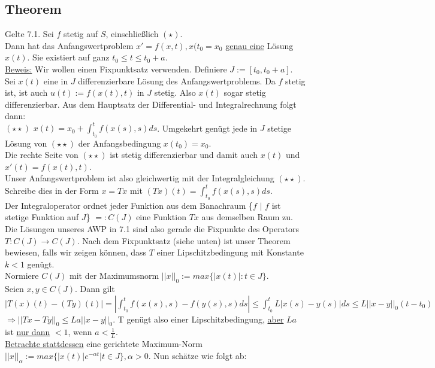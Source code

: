 \documentclass[12pt,a4paper]{article}
\newcommand{\Lsg}{Lösung }
\newcommand{\LSG}{Lösungen }
\begin{document}
\subsection{Theorem}
Gelte 7.1. Sei $f$ stetig auf $S$, einschließlich $(\star)$. \\
Dann hat das Anfangswertproblem $x'=f(x,t), x(t_0 = x_0$ \underline{genau eine} \Lsg $x(t)$. Sie existiert auf ganz $t_0 \leq t \leq t_0 + a$. \\
\underline{Beweis:} Wir wollen einen Fixpunktsatz verwenden. Definiere $J := [t_0, t_0+a]$. \\
Sei $x(t)$ eine in $J$ differenzierbare \Lsg des Anfangswertproblems. Da $f$ stetig ist, ist auch $u(t):=f(x(t),t)$ in $J$ stetig. Also $x(t)$ sogar stetig differenzierbar. Aus dem Hauptsatz der Differential- und Integralrechnung folgt dann: \\
$(\star \star)$ $x(t) = x_0 + \int_{t_0}^{t} f(x(s),s) ds$. Umgekehrt genügt jede in $J$ stetige \Lsg von $(\star \star)$ der Anfangsbedingung $x(t_0) = x_0$. \\
Die rechte Seite von $(\star \star)$ ist stetig differenzierbar und damit auch $x(t)$ und $x'(t)=f(x(t),t)$. \\
Unser Anfangswertproblem ist also gleichwertig mit der Integralgleichung $(\star \star)$. \\
Schreibe dies in der Form $x=Tx$ mit $(Tx)(t) = \int_{t_0}^{t} f(x(s),s) ds$. \\
Der Integraloperator ordnet jeder Funktion aus dem Banachraum \{$f$ $|$ $f$ ist stetige Funktion auf $J$\} $=: C(J)$ eine Funktion $Tx$ aus demselben Raum zu. Die \LSG unseres AWP in 7.1 sind also gerade die Fixpunkte des Operators $T:C(J) \rightarrow C(J)$. Nach dem Fixpunktsatz (siehe unten) ist unser Theorem bewiesen, falls wir zeigen können, dass $T$ einer Lipschitzbedingung mit Konstante $k<1$ genügt. \\
Normiere $C(J)$ mit der Maximumsnorm $||x||_0 := max\{|x(t)| : t \in J\}$. \\
Seien $x,y \in C(J)$. Dann gilt $|T(x)(t)-(Ty)(t)|=|\int_{t_0}^{t} f(x(s),s)-f(y(s),s) ds| \leq \int_{t_0}^t L|x(s)-y(s)|ds \leq L||x-y||_0(t-t_0)$ \\
$\Rightarrow ||Tx-Ty||_0 \leq La||x-y||_0$. T genügt also einer Lipschitzbedingung, \underline{aber} $La$ ist \underline{nur dann} $<1$, wenn $a<\frac{1}{L}$. \\
\underline{Betrachte stattdessen} eine gerichtete Maximum-Norm $||x||_\alpha := max\{|x(t)| e^{-\alpha t} | t \in J\}, \alpha > 0$. Nun schätze wie folgt ab: \\ 
\end{document}
